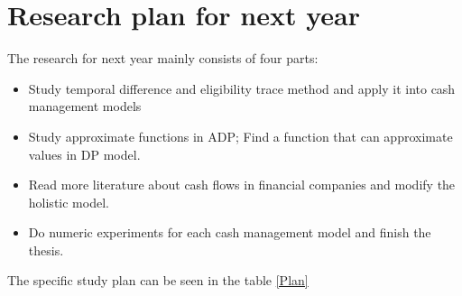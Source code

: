 \documentclass[12pt]{article}
\begin{document}
\section{Research plan for next year}

The research for next year mainly consists of four parts: 
\begin{itemize}
\item Study temporal difference and eligibility trace method and apply it into cash management models
\item Study approximate functions in ADP; Find a function that can approximate values in DP model.
\item Read more literature about cash flows in financial companies and modify the holistic model.
\item Do numeric experiments for each cash management model and finish the thesis.
\end{itemize}
The specific study plan can be seen in the table \ref{Plan}
\end{document}
